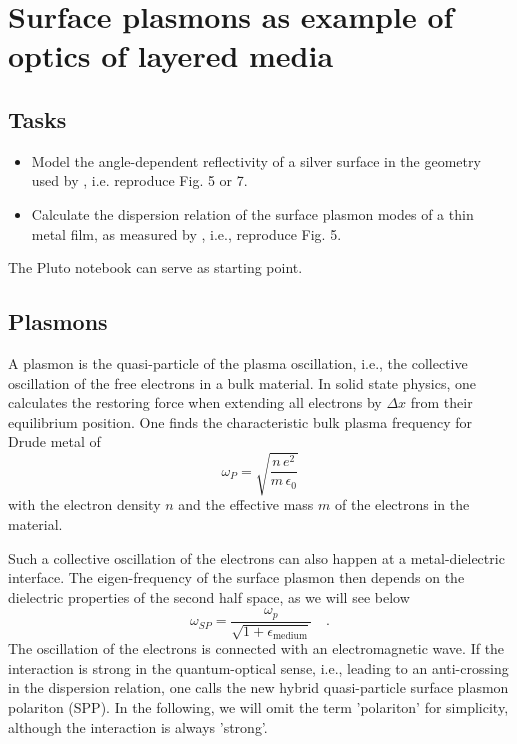 \renewcommand{\lastmod}{November  11, 2021}
\renewcommand{\chapterauthors}{Markus Lippitz}


\chapter{Surface plasmons as example of optics of layered media}
\label{chap:tmatrix}


\section{Tasks}

\begin{itemize}
\item Model the angle-dependent reflectivity of a silver surface in the geometry used by \cite{Otto68}, i.e. reproduce Fig. 5 or 7.

\item Calculate the dispersion relation of the surface plasmon modes of a thin metal film, as measured by \cite{Pettit75}, i.e., reproduce Fig. 5.
\end{itemize}

The Pluto notebook can serve as starting point.

\section{Plasmons}

A plasmon is the quasi-particle of the plasma oscillation, i.e., the collective oscillation of the free electrons in a bulk material. In solid state physics, one calculates the restoring force when extending all electrons by $\Delta x$ from their equilibrium position. One finds the characteristic bulk plasma frequency for  Drude metal of 
\begin{equation}
 \omega_P = \sqrt{\frac{n \, e^2}{m \, \epsilon_0}}
\end{equation}
with the electron density $n$ and the effective mass $m$ of the electrons in the material.

Such a collective oscillation of the electrons can also happen at a metal-dielectric interface. The eigen-frequency of the surface plasmon then depends on the dielectric properties of the second half space, as we will see below
\begin{equation}
\omega_{SP} = \frac{\omega_p}{\sqrt{1 + \epsilon_\text{medium}}} \quad . \label{eq:surface_omega_sp_intro}
\end{equation}
The oscillation of the electrons is connected with an electromagnetic wave.  If the interaction is strong in the quantum-optical sense, i.e., leading to an anti-crossing in the dispersion relation, one calls the new hybrid quasi-particle surface plasmon polariton (SPP). In the following, we will omit  the term 'polariton' for simplicity, although the interaction is always 'strong'.

